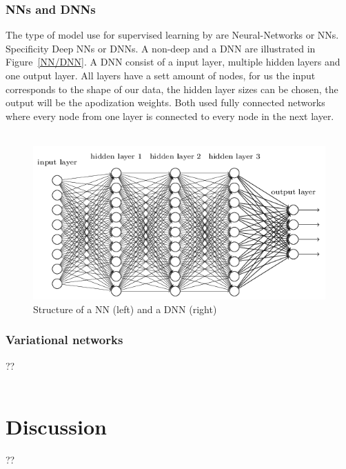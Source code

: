 \documentclass[12pt, a4paper, twoside, UKenglish]{article}
\begin{document}
\subsubsection{NNs and DNNs}
The type of model use for supervised learning by  \cite{Adaptive-Deep-Learning, Kjenstad} are Neural-Networks or NNs. Specificity Deep NNs or DNNs. A non-deep and a DNN are illustrated in Figure~\vref{NN/DNN}. A DNN consist of a input layer, multiple hidden layers and one output layer. All layers have a sett amount of nodes, for us the input corresponds to the shape of our data, the hidden layer sizes can be chosen, the output will be the apodization weights. Both \cite{Adaptive-Deep-Learning, Kjenstad} used fully connected networks where every node from one layer is connected to every node in the next layer.
\\
\ \\

\begin{figure}[!htb]
	\includegraphics[scale=0.6]{DNN.png}
	\caption{Structure of a NN (left) and a DNN (right)\label{NN/DNN}}
\end{figure}

\subsubsection{Variational networks}
??\\
\ \\

\section{Discussion}
??\\
\ \\

\printbibliography
\end{document}
